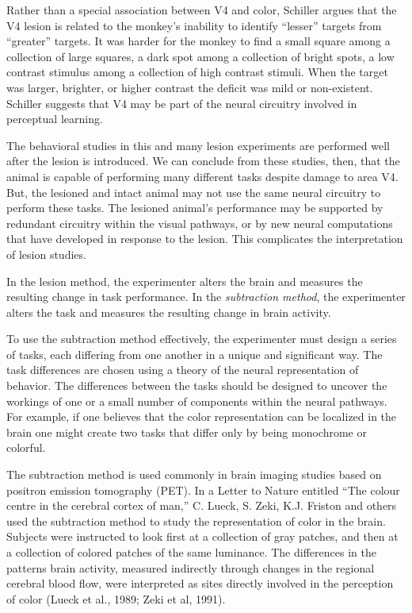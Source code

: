 Rather than a special association between V4 and color, Schiller
argues that the V4 lesion is related to the monkey's inability to
identify ``lesser'' targets from ``greater'' targets.  It was harder
for the monkey to find a small square among a collection of large
squares, a dark spot among a collection of bright spots, a low
contrast stimulus among a collection of high contrast stimuli.  When
the target was larger, brighter, or higher contrast the deficit was
mild or non-existent.  Schiller suggests that V4 may be part of the
neural circuitry involved in perceptual learning.

The behavioral studies in this and many lesion experiments are
performed well after the lesion is introduced.  We can conclude from
these studies, then, that the animal is capable of performing many
different tasks despite damage to area V4.  But, the lesioned and
intact animal may not use the same neural circuitry to perform these
tasks.  The lesioned animal's performance may be supported by
redundant circuitry within the visual pathways, or by new neural
computations that have developed in response to the lesion.  This
complicates the interpretation of lesion studies.

In the lesion method, the experimenter alters the brain and measures
the resulting change in task performance.  In the {\em subtraction
method}, the experimenter alters the task and measures the resulting
change in brain activity.

To use the subtraction method effectively, the experimenter must
design a series of tasks, each differing from one another in a unique
and significant way.  The task differences are chosen using a theory
of the neural representation of behavior.  The differences between the
tasks should be designed to uncover the workings of one or a small
number of components within the neural pathways.  For example, if one
believes that the color representation can be localized in the brain
one might create two tasks that differ only by being monochrome or
colorful.

The subtraction method is used commonly in brain imaging studies based
on positron emission tomography (PET).  In a Letter to Nature entitled
``The colour centre in the cerebral cortex of man,'' C. Lueck,
S. Zeki, K.J. Friston and others used the subtraction method to study
the representation of color in the brain.  Subjects were instructed to
look first at a collection of gray patches, and then at a collection
of colored patches of the same luminance.  The differences in the
patterns brain activity, measured indirectly through changes in the
regional cerebral blood flow, were interpreted as sites directly
involved in the perception of color (Lueck et al., 1989; Zeki et al,
1991).

